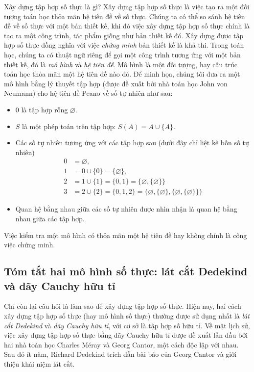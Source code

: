 Xây dựng tập hợp số thực là gì? Xây dựng tập hợp số thực là việc tạo ra một đối tượng toán học thỏa mãn hệ tiên đề về số thực. Chúng ta có thể so sánh hệ tiên đề về số thực với một bản thiết kế, khi đó việc xây dựng tập hợp số thực chính là tạo ra một công trình, tác phẩm giống như bản thiết kế đó. Xây dựng được tập hợp số thực đồng nghĩa với việc \textit{chứng minh} bản thiết kế là khả thi. Trong toán học, chúng ta có thuật ngữ riêng để gọi một công trình tương ứng với một bản thiết kế, đó là \textit{mô hình} và \textit{hệ tiên đề}. Mô hình là một đối tượng, hay cấu trúc toán học thỏa mãn một hệ tiên đề nào đó. Để minh họa, chúng tôi đưa ra một mô hình bằng lý thuyết tập hợp (được đề xuất bởi nhà toán học John von Neumann) cho hệ tiên đề Peano về số tự nhiên như sau:
\begin{itemize}
    \item $0$ là tập hợp rỗng $\varnothing$.
    \item $S$ là một phép toán trên tập hợp: $S(A) = A \cup \{ A \}$.
    \item Các số tự nhiên tương ứng với các tập hợp sau (dưới đây chỉ liệt kê bốn số tự nhiên)
          \begin{align*}
              0 & = \varnothing,                                                                                                \\
              1 & = 0 \cup \{ 0 \} = \{ \varnothing \},                                                                         \\
              2 & = 1 \cup \{ 1 \} = \{ 0, 1 \}  = \{ \varnothing, \{ \varnothing \} \}                                         \\
              3 & = 2 \cup \{ 2 \} = \{ 0, 1, 2 \} = \{ \varnothing, \{ \varnothing \}, \{ \varnothing, \{ \varnothing \} \} \}
          \end{align*}
    \item Quan hệ bằng nhau giữa các số tự nhiên được nhìn nhận là quan hệ bằng nhau giữa các tập hợp.
\end{itemize}

Việc kiểm tra một mô hình có thỏa mãn một hệ tiên đề hay không chính là công việc chứng minh.

\subsection{Tóm tắt hai mô hình số thực: lát cắt Dedekind và dãy Cauchy hữu tỉ}

Chỉ còn lại câu hỏi là làm sao để xây dựng tập hợp số thực. Hiện nay, hai cách xây dựng tập hợp số thực (hay mô hình số thực) thường được sử dụng nhất là \textit{lát cắt Dedekind} và \textit{dãy Cauchy hữu tỉ}, với cơ sở là tập hợp số hữu tỉ. Về mặt lịch sử, việc xây dựng tập hợp số thực bằng dãy Cauchy hữu tỉ được đề xuất lần đầu bởi hai nhà toán học Charles M\'{e}ray và Georg Cantor, một cách độc lập với nhau. Sau đó ít năm, Richard Dedekind trích dẫn bài báo của Georg Cantor và giới thiệu khái niệm lát cắt.

